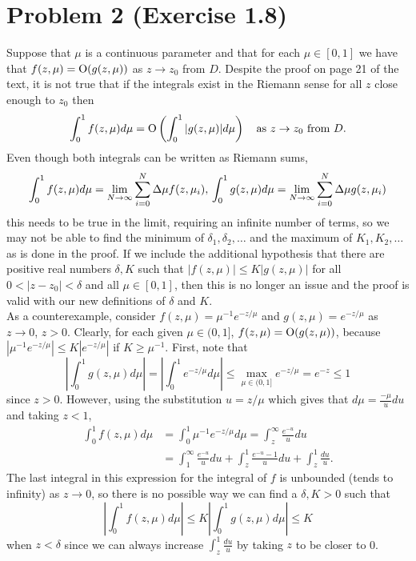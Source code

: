 \documentclass{article}
\begin{document}
\section{Problem 2 (Exercise 1.8)}
Suppose that $\mu$ is a continuous parameter and that for each $\mu \in [0,1]$ we have that $f(z,\mu) = \operatorname{O}(g(z,\mu))$ as $z \to z_0$ from $D$. Despite the proof on page 21 of the text, it is not true that if the integrals exist in the Riemann sense for all $z$ close enough to $z_0$ then
  \begin{align*}
    \int_0^1 f(z,\mu) d \mu = \operatorname{O} \left( \int_0^1 |g(z,\mu)| d \mu \right) \quad \text{as $z \to z_0$ from $D$}.
  \end{align*} 
Even though both integrals can be written as Riemann sums, 
\[
\int_0^1 f(z,\mu) d \mu=\lim_{N\to\infty}\sum_{i=0}^N\Delta\mu f(z,\mu_i),\quad\\
\int_0^1 g(z,\mu) d \mu=\lim_{N\to\infty}\sum_{i=0}^N\Delta\mu g(z,\mu_i)\\
\]
this needs to be true in the limit, requiring an infinite number of terms, so we may not be able to find the minimum of $\delta_1,\delta_2,\ldots$ and the maximum of $K_1,K_2,\ldots$ as is done in the proof. If we include the additional hypothesis that there are positive real numbers $\delta, K$ such that $|f(z,\mu)|\leq K|g(z,\mu)|$ for all $0<|z-z_0|<\delta$ and all $\mu\in[0,1]$, then this is no longer an issue and the proof is valid with our new definitions of $\delta$ and $K$. \\
As a counterexample, consider $f(z,\mu)=\mu^{-1}e^{-z/\mu}$ and $g(z,\mu)=e^{-z/\mu}$ as $z\to0$, $z>0$. Clearly, for each given $\mu\in(0,1]$, $f(z,\mu)=\operatorname{O}(g(z,\mu))$, because $|\mu^{-1}e^{-z/\mu}|\leq K|e^{-z/\mu}|$ if $K\geq\mu^{-1}$. First, note that 
\[
\left|\int_0^1 g(z,\mu) d \mu\right|=\left|\int_0^1 e^{-z/\mu} d \mu\right|\leq\max_{\mu\in(0,1]}e^{-z/\mu}=e^{-z}\leq1
\]
since $z>0$. However, using the substitution $u=z/\mu$ which gives that $d\mu=\frac{-\mu}{u}du$ and taking $z<1$, 
\begin{align*}
\int_0^1 f(z,\mu) d \mu&=\int_0^1 \mu^{-1}e^{-z/\mu} d \mu=\int_z^\infty\frac{e^{-u}}{u}du\\&=\int_1^\infty\frac{e^{-u}}{u}du+\int_z^1\frac{e^{-u}-1}{u}du+\int_z^1\frac{du}{u}.
\end{align*}
The last integral in this expression for the integral of $f$ is unbounded (tends to infinity) as $z\to0$, so there is no possible way we can find a $\delta,K>0$ such that 
\[
\left|\int_0^1 f(z,\mu) d \mu\right|\leq K\left|\int_0^1 g(z,\mu) d \mu\right|\leq K
\]
when $z<\delta$ since we can always increase $\int_z^1\frac{du}{u}$ by taking $z$ to be closer to 0.
\end{document}
